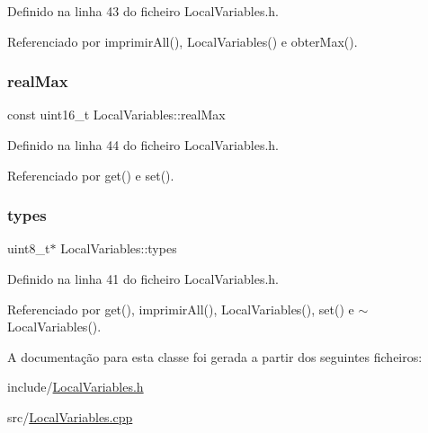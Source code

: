 Definido na linha 43 do ficheiro Local\+Variables.\+h.



Referenciado por imprimir\+All(), Local\+Variables() e obter\+Max().

\mbox{\label{classLocalVariables_a892e685ce3c1c5e6da9e1db542d865e9}} 
\subsubsection{\texorpdfstring{real\+Max}{realMax}}
{\footnotesize\ttfamily const uint16\+\_\+t Local\+Variables\+::real\+Max\hspace{0.3cm}{\ttfamily [private]}}



Definido na linha 44 do ficheiro Local\+Variables.\+h.



Referenciado por get() e set().

\mbox{\label{classLocalVariables_ac73d4583cc3f8b295c8c986cee21fe30}} 
\subsubsection{\texorpdfstring{types}{types}}
{\footnotesize\ttfamily uint8\+\_\+t$\ast$ Local\+Variables\+::types\hspace{0.3cm}{\ttfamily [private]}}



Definido na linha 41 do ficheiro Local\+Variables.\+h.



Referenciado por get(), imprimir\+All(), Local\+Variables(), set() e $\sim$\+Local\+Variables().



A documentação para esta classe foi gerada a partir dos seguintes ficheiros\+:\begin{DoxyCompactItemize}
\item 
include/\hyperlink{LocalVariables_8h}{Local\+Variables.\+h}\item 
src/\hyperlink{LocalVariables_8cpp}{Local\+Variables.\+cpp}\end{DoxyCompactItemize}
